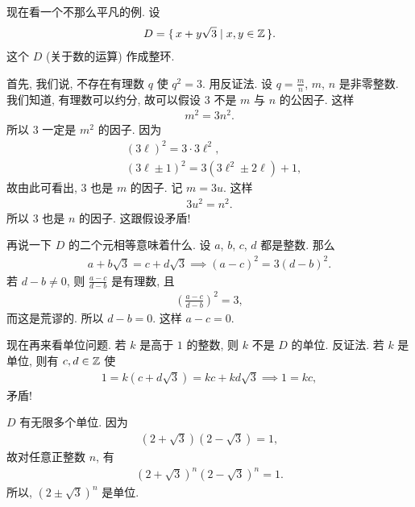 \begin{example}
    现在看一个不那么平凡的例. 设
    \begin{align*}
        D = \{\, x + y\sqrt{3} \mid x,y \in \mathbb{Z} \,\}.
    \end{align*}
    这个 $D$ (关于数的运算) 作成整环.

    首先, 我们说, 不存在有理数 $q$ 使 $q^2 = 3$. 用反证法. 设 $q = \frac{m}{n}$, $m$, $n$ 是非零整数. 我们知道, 有理数可以约分, 故可以假设 $3$ 不是 $m$ 与 $n$ 的公因子. 这样
    \begin{align*}
        m^2 = 3n^2.
    \end{align*}
    所以 $3$ 一定是 $m^2$ 的因子. 因为
    \begin{align*}
         & (3\ell)^2 = 3 \cdot 3\ell^2,                \\
         & (3\ell \pm 1)^2 = 3(3\ell^2 \pm 2\ell) + 1,
    \end{align*}
    故由此可看出, $3$ 也是 $m$ 的因子. 记 $m=3u$. 这样
    \begin{align*}
        3u^2 = n^2.
    \end{align*}
    所以 $3$ 也是 $n$ 的因子. 这跟假设矛盾!

    再说一下 $D$ 的二个元相等意味着什么. 设 $a$, $b$, $c$, $d$ 都是整数. 那么
    \begin{align*}
        a + b\sqrt{3} = c + d\sqrt{3} \implies (a-c)^2 = 3(d-b)^2.
    \end{align*}
    若 $d - b \neq 0$, 则 $\frac{a-c}{d-b}$ 是有理数, 且
    \begin{align*}
        \left( \frac{a-c}{d-b} \right)^2 = 3,
    \end{align*}
    而这是荒谬的. 所以 $d - b = 0$. 这样 $a - c = 0$.

    现在再来看单位问题. 若 $k$ 是高于 $1$ 的整数, 则 $k$ 不是 $D$ 的单位. 反证法. 若 $k$ 是单位, 则有 $c,d \in \mathbb{Z}$ 使
    \begin{align*}
        1 = k(c + d\sqrt{3}) = kc + kd\sqrt{3} \implies 1 = kc,
    \end{align*}
    矛盾!

    $D$ 有无限多个单位. 因为
    \begin{align*}
        (2+\sqrt{3})(2-\sqrt{3})=1,
    \end{align*}
    故对任意正整数 $n$, 有
    \begin{align*}
        (2+\sqrt{3})^n (2-\sqrt{3})^n=1.
    \end{align*}
    所以, $(2 \pm \sqrt{3})^n$ 是单位.
\end{example}

